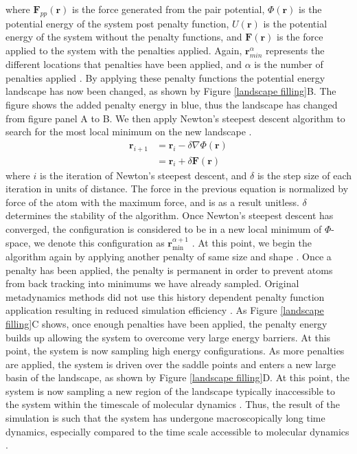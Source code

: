where $\mathbf{F}_{pp}(\mathbf{r})$ is the force generated from the pair potential, $\Phi(\mathbf{r})$ is the potential energy of the system post penalty function, $U(\mathbf{r})$ is the potential energy of the system without the penalty functions, and $\mathbf{F}(\mathbf{r})$ is the force applied to the system with the penalties applied.  Again, $\mathbf{r}^\alpha_{min}$ represents the different locations that penalties have been applied, and $\alpha$ is the number of penalties applied \cite{Kushima2009, Kushima2009a}.  By applying these penalty functions the potential energy landscape has now been changed, as shown by Figure \ref{landscape filling}B.  The figure shows the added penalty energy in blue, thus the landscape has changed from figure panel A to B.  We then apply Newton's steepest descent algorithm to search for the most local minimum on the new landscape \cite{Kushima2009, Kushima2009a}.  
\begin{equation}
\begin{split}
	\mathbf{r}_{i+1} &= \mathbf{r}_{i} - \delta\nabla\Phi(\mathbf{r}) \\
					 &= \mathbf{r}_{i} + \delta\mathbf{F}(\mathbf{r})
\end{split}
\end{equation}
where $i$ is the iteration of Newton's steepest descent, and $\delta$ is the step size of each iteration in units of distance.  The force in the previous equation is normalized by force of the atom with the maximum force, and is as a result unitless.  $\delta$ determines the stability of the algorithm.  Once Newton's steepest descent has converged, the configuration is considered to be in a new local minimum of $\Phi$-space, we denote this configuration as $\mathbf{r}_{\min}^{\alpha+1}$ \cite{Kushima2009, Kushima2009a}.  At this point, we begin the algorithm again by applying another penalty of same size and shape \cite{Kushima2009, Kushima2009a}.  Once a penalty has been applied, the penalty is permanent in order to prevent atoms from back tracking into minimums we have already sampled.  Original metadynamics methods did not use this history dependent penalty function application resulting in reduced simulation efficiency \cite{Kushima2009, Kushima2009a}.  As Figure \ref{landscape filling}C shows, once enough penalties have been applied, the penalty energy builds up allowing the system to overcome very large energy barriers.  At this point, the system is now sampling high energy configurations.  As more penalties are applied, the system is driven over the saddle points and enters a new large basin of the landscape, as shown by Figure \ref{landscape filling}D.  At this point, the system is now sampling a new region of the landscape typically inaccessible to the system within the timescale of molecular dynamics \cite{Kushima2009, Kushima2009a}.  Thus, the result of the simulation is such that the system has undergone macroscopically long time dynamics, especially compared to the time scale accessible to molecular dynamics \cite{Kushima2009, Kushima2009a}.

